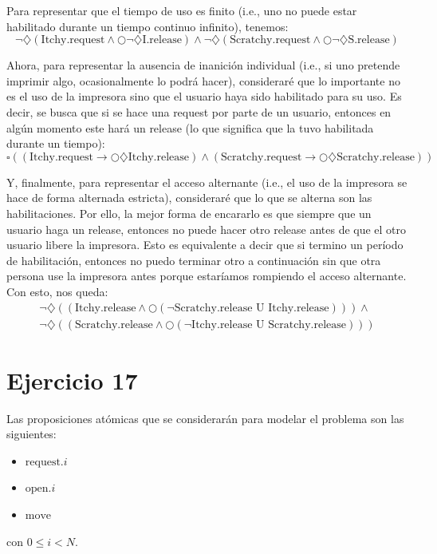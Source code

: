 \documentclass{article}
\begin{document}
Para representar que el tiempo de uso es finito (i.e., uno no puede estar habilitado durante un tiempo continuo infinito), tenemos:
\begin{equation*}
	\neg \diamondsuit (\text{Itchy.request} \land \bigcirc \neg \diamondsuit \text{I.release}) \land \neg \diamondsuit (\text{Scratchy.request} \land \bigcirc \neg \diamondsuit \text{S.release})
\end{equation*}

Ahora, para representar la ausencia de inanición individual (i.e., si uno pretende imprimir algo, ocasionalmente lo podrá hacer), consideraré que lo importante no es el uso de la impresora sino que el usuario haya sido habilitado para su uso.
Es decir, se busca que si se hace una request por parte de un usuario, entonces en algún momento este hará un release (lo que significa que la tuvo habilitada durante un tiempo):
\begin{equation*}
	\square ((\text{Itchy.request} \to \bigcirc \diamondsuit \text{Itchy.release}) \land (\text{Scratchy.request} \to \bigcirc \diamondsuit \text{Scratchy.release}))
\end{equation*}

Y, finalmente, para representar el acceso alternante (i.e., el uso de la impresora se hace de forma alternada estricta), consideraré que lo que se alterna son las habilitaciones.
Por ello, la mejor forma de encararlo es que siempre que un usuario haga un release, entonces no puede hacer otro release antes de que el otro usuario libere la impresora.
Esto es equivalente a decir que si termino un período de habilitación, entonces no puedo terminar otro a continuación sin que otra persona use la impresora antes porque estaríamos rompiendo el acceso alternante.
Con esto, nos queda:
\begin{equation*}
	\begin{aligned}
		\neg \diamondsuit \left(\left(\text{Itchy.release} \land \bigcirc \left(\neg \text{Scratchy.release U Itchy.release}\right)\right)\right) \land \\
		\neg \diamondsuit \left(\left(\text{Scratchy.release} \land \bigcirc \left(\neg \text{Itchy.release U Scratchy.release}\right)\right)\right)
	\end{aligned}
\end{equation*}

\section*{Ejercicio 17}
Las proposiciones atómicas que se considerarán para modelar el problema son las siguientes:
\begin{itemize}
	\item $\text{request}.i$
	\item $\text{open}.i$
	\item $\text{move}$
\end{itemize}
con $0 \leq i < N$.
\end{document}
